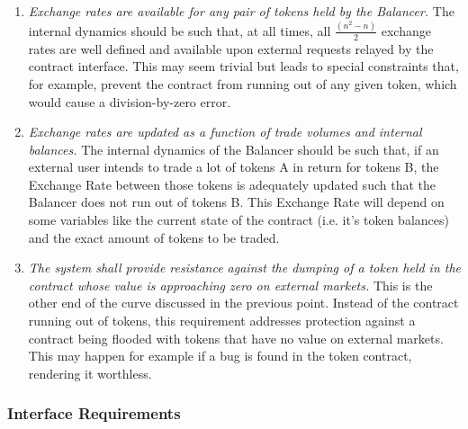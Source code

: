 \documentclass[11pt]{amsart}
\begin{document}
\begin{enumerate}
    \item \textit{Exchange rates are available for any pair of tokens held by the Balancer.} The internal dynamics should be such that, at all times, all $\frac{(n^2 - n)}{2}$ exchange rates are well defined and available upon external requests relayed by the contract interface. This may seem trivial but leads to special constraints that, for example, prevent the contract from running out of any given token, which would cause a division-by-zero error. 
    
    \item \textit{Exchange rates are updated as a function of trade volumes and internal balances.} The internal dynamics of the Balancer should be such that, if an external user intends to trade a lot of tokens A in return for tokens B, the Exchange Rate between those tokens is adequately updated such that the Balancer does not run out of tokens B. This Exchange Rate will depend on some variables like the current state of the contract (i.e. it's token balances) and the exact amount of tokens to be traded.
    
    \item \textit{The system shall provide resistance against the dumping of a token held in the contract whose value is approaching zero on external markets.} This is the other end of the curve discussed in the previous point. Instead of the contract running out of tokens, this requirement addresses protection against a contract being flooded with tokens that have no value on external markets. This may happen for example if a bug is found in the token contract, rendering it worthless.

\end{enumerate}

\subsubsection{Interface Requirements}
\end{document}
